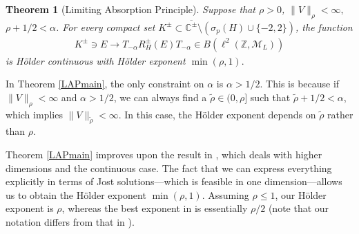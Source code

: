\documentclass[12pt,oneside,onecolumn,open]{article}
\newtheorem{teo}{Theorem}[section]
\begin{document}



\begin{teo}[Limiting Absorption Principle]\label{LAPmain2} 
Suppose that $ \rho > 0 $,  $\|  V \|
  _{\rho} < \infty ,$ $\rho + 1/2<\alpha $.    For every compact set $  K^{\pm}  \subset \overline{ \mathbb{C}^{\pm} } \setminus (\sigma_p(H) \cup \{ -2, 2\} )  $, the function 
\begin{align}
   K^{\pm} \ni E \to   T_{-\alpha }R^{\pm}_{H}(E)T_{-\alpha }  \in B(\ell ^{2}(\mathbb{Z}, \mathcal{M}_L))    \end{align}
is H\"older continuous  with H\"older exponent $ \min(\rho, 1)  .$


\end{teo}
     
  
  In Theorem \ref{LAPmain}, the only constraint on $\alpha$ is $\alpha > 1/2$. This is because if $\| V \|_{\rho} < \infty$ and $\alpha > 1/2$, we can always find a $\tilde{\rho} \in (0, \rho]$ such that $\tilde{\rho} + 1/2 < \alpha$, which implies $\| V \|_{ \tilde{\rho}} < \infty$. In this case, the H\"older exponent depends on $\tilde{\rho}$ rather than $\rho$.

Theorem \ref{LAPmain} improves upon the result in \cite{MR2598115}, which deals with higher dimensions and the continuous case. The fact that we can express everything explicitly in terms of Jost solutions---which is feasible in one dimension---allows us to obtain the H\"older exponent $ \min(\rho, 1) $. Assuming $\rho \leq 1$, our H\"older exponent is $\rho$, whereas the best exponent in \cite{MR2598115} is essentially $\rho/2$ (note that our notation differs from that in \cite{MR2598115}).
  
\end{document}
